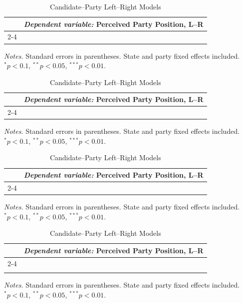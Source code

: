 \begin{table}[!htbp]\centering
\caption{Candidate--Party Left--Right Models}
\label{tab:cand_party_lr}
\begin{tabular}{lccc}
\toprule
 & \multicolumn{3}{c}{\textit{Dependent variable:} Perceived Party Position, L--R} \\
\cmidrule(lr){2-4}
\bottomrule
\end{tabular}
\vspace{0.2em}
{\footnotesize \textit{Notes.} Standard errors in parentheses. State and party fixed effects included. \\$^{*}p<0.1$, $^{**}p<0.05$, $^{***}p<0.01$.}
\end{table}

\begin{table}[!htbp]\centering
\caption{Candidate--Party Left--Right Models}
\label{tab:cand_party_lr}
\begin{tabular}{lccc}
\toprule
 & \multicolumn{3}{c}{\textit{Dependent variable:} Perceived Party Position, L--R} \\
\cmidrule(lr){2-4}
\\[-1.8ex]\hline \bottomrule
\end{tabular}
\vspace{0.2em}
{\footnotesize \textit{Notes.} Standard errors in parentheses. State and party fixed effects included. \\$^{*}p<0.1$, $^{**}p<0.05$, $^{***}p<0.01$.}
\end{table}

\begin{table}[!htbp]\centering
\caption{Candidate--Party Left--Right Models}
\label{tab:cand_party_lr}
\begin{tabular}{lccc}
\toprule
 & \multicolumn{3}{c}{\textit{Dependent variable:} Perceived Party Position, L--R} \\
\cmidrule(lr){2-4}
\hline \\[-1.8ex] \bottomrule
\end{tabular}
\vspace{0.2em}
{\footnotesize \textit{Notes.} Standard errors in parentheses. State and party fixed effects included. \\$^{*}p<0.1$, $^{**}p<0.05$, $^{***}p<0.01$.}
\end{table}

\begin{table}[!htbp]\centering
\caption{Candidate--Party Left--Right Models}
\label{tab:cand_party_lr}
\begin{tabular}{lccc}
\toprule
 & \multicolumn{3}{c}{\textit{Dependent variable:} Perceived Party Position, L--R} \\
\cmidrule(lr){2-4}
\\[-1.8ex] & \multicolumn{3}{c}{} \\ \bottomrule
\end{tabular}
\vspace{0.2em}
{\footnotesize \textit{Notes.} Standard errors in parentheses. State and party fixed effects included. \\$^{*}p<0.1$, $^{**}p<0.05$, $^{***}p<0.01$.}
\end{table}

